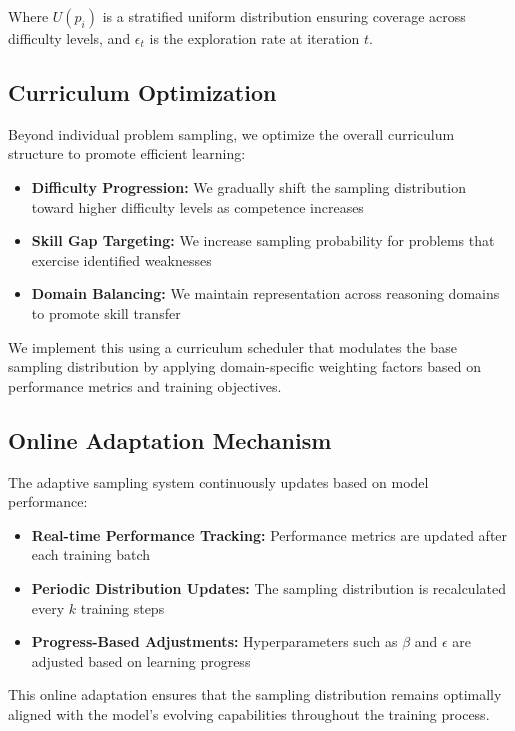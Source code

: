 Where $U(p_i)$ is a stratified uniform distribution ensuring coverage across difficulty levels, and $\epsilon_t$ is the exploration rate at iteration $t$.

\subsection{Curriculum Optimization}

Beyond individual problem sampling, we optimize the overall curriculum structure to promote efficient learning:

\begin{itemize}
    \item \textbf{Difficulty Progression:} We gradually shift the sampling distribution toward higher difficulty levels as competence increases
    \item \textbf{Skill Gap Targeting:} We increase sampling probability for problems that exercise identified weaknesses
    \item \textbf{Domain Balancing:} We maintain representation across reasoning domains to promote skill transfer
\end{itemize}

We implement this using a curriculum scheduler that modulates the base sampling distribution by applying domain-specific weighting factors based on performance metrics and training objectives.

\subsection{Online Adaptation Mechanism}

The adaptive sampling system continuously updates based on model performance:

\begin{itemize}
    \item \textbf{Real-time Performance Tracking:} Performance metrics are updated after each training batch
    \item \textbf{Periodic Distribution Updates:} The sampling distribution is recalculated every $k$ training steps
    \item \textbf{Progress-Based Adjustments:} Hyperparameters such as $\beta$ and $\epsilon$ are adjusted based on learning progress
\end{itemize}

This online adaptation ensures that the sampling distribution remains optimally aligned with the model's evolving capabilities throughout the training process.

